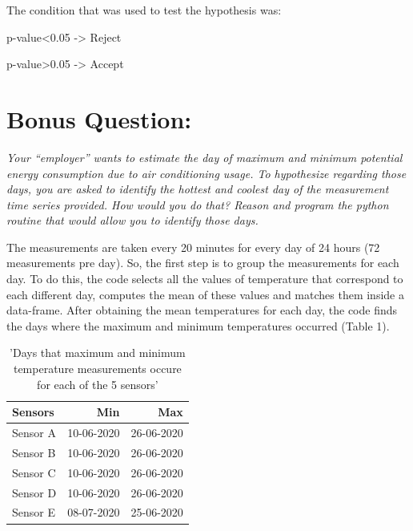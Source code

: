 \documentclass[a4paper,12pt]{article} %
\begin{document}
The condition that was used to test the hypothesis was:


p-value<0.05  ->  Reject


p-value>0.05  ->  Accept





\section{\bf Bonus Question:}


{\it Your “employer” wants to estimate the day of maximum and minimum potential energy 
consumption due to air conditioning usage. To hypothesize regarding those days, 
you are asked to identify the hottest and coolest day of the measurement time series provided. 
How would you do that? Reason and program the python routine that would allow you to identify those days.}




The measurements are taken every 20 minutes for every day of 24 hours (72 measurements pre day). 
So, the first step is to group the measurements for each day. To do this, the code selects all the values
of temperature that correspond to each different day, computes the mean of these values and matches them
inside a data-frame. After obtaining the mean temperatures for each day, the code finds the days where the maximum and minimum 
temperatures occurred (Table 1).




\begin{table}[H]
\begin{center}
\begin{tabular}[\textwidth]{|l|r|r|} \hline 
\centering
    Sensors     & Min           & Max           \\\hline
    Sensor A    & 10-06-2020    & 26-06-2020    \\\hline
    Sensor B    & 10-06-2020    & 26-06-2020    \\\hline
    Sensor C    & 10-06-2020    & 26-06-2020    \\\hline
    Sensor D    & 10-06-2020    & 26-06-2020    \\\hline
    Sensor E    & 08-07-2020    & 25-06-2020    \\\hline
\end{tabular}
\caption{'Days that maximum and minimum temperature measurements occure for each of the 5 sensors'}
\end{center}
\end{table}
\end{document}
